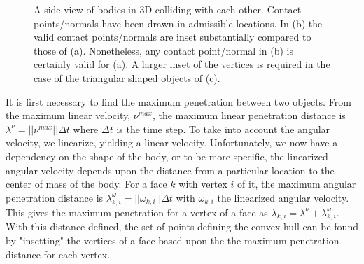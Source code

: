 \documentclass[9pt,twocolumn]{article}
\begin{document}
\begin{figure}[t!]
{	\label{fig:subfig2}
}
\caption{A side view of bodies in 3D colliding with each other. Contact points/normals have been drawn in admissible locations. In (b) the valid contact points/normals  are inset substantially compared to those of (a). Nonetheless, any contact point/normal in (b) is certainly valid for (a). A larger inset of the vertices is required in the case of the triangular shaped objects of (c). }
\label{PenetrationDist1}
\end{figure}

It is first necessary to find the maximum penetration between two objects. From the maximum linear velocity, $\nu^{max}$, the maximum linear penetration distance is $\lambda^{\nu} =  ||\nu^{max}|| \Delta t$ where $\Delta t$ is the time step. To take into account the angular velocity, we linearize, yielding a  linear velocity. Unfortunately, we now have a dependency on the shape of the body, or to be more specific, the linearized angular velocity depends upon the distance from a particular location to the center of mass of the body. For a face $k$ with vertex $i$ of it, the maximum angular penetration distance is $\lambda_{k,i}^\omega = ||\omega_{k,i}|| \Delta t$ with $\omega_{k,i}$ the linearized angular velocity. This gives the maximum penetration for a vertex of a face as $\lambda_{k,i} = \lambda^\nu + \lambda_{k,i}^{\omega}$. With this distance defined, the set of points defining the convex hull can be found by "insetting" the vertices of a face based upon the the maximum penetration distance for each vertex. \newline
\end{document}
